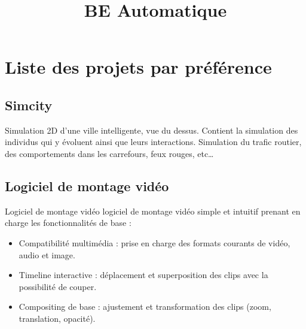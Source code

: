 \documentclass{rapport}
\title{BE Automatique} %
\begin{document}

\subject{Sujets} %



        
\buildmargins %
\buildcover %
\toc %


\section{Liste des projets par préférence}

\hypertarget{simcity}{%
\subsection{Simcity}\label{simcity}}

Simulation 2D d'une ville intelligente, vue du dessus. Contient la
simulation des individus qui y évoluent ainsi que leurs interactions.
Simulation du trafic routier, des comportements dans les carrefours,
feux rouges, etc\ldots{}

\hypertarget{logiciel-de-montage-viduxe9o}{%
\subsection{Logiciel de montage vidéo}\label{logiciel-de-montage-viduxe9o}}

Logiciel de montage vidéo logiciel de montage vidéo simple et intuitif
prenant en charge les fonctionnalités de base :
\begin{itemize}
    \item Compatibilité multimédia : prise en charge des formats courants de vidéo, audio et image. 
    \item Timeline interactive : déplacement et superposition des clips avec la possibilité de couper. 
    \item Compositing de base : ajustement et transformation des clips (zoom, translation, opacité).
\end{itemize}
\end{document}
